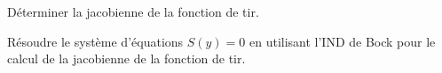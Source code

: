 \begin{myQuestion}
    \label{question:bang_bang_jacobienne}
    D\'eterminer la jacobienne de la fonction de tir.
\end{myQuestion}

\begin{myExercice}
    R\'esoudre le syst\`eme d'\'equations $S(y) = 0$ en utilisant l'IND de Bock pour le calcul de la jacobienne de la fonction de tir.
\end{myExercice}

